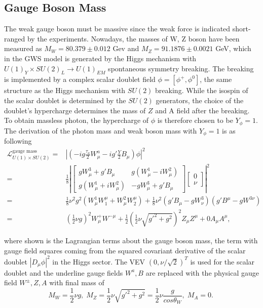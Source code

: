 \subsection{Gauge Boson Mass}
The weak gauge boson must be massive since the weak force is indicated short-ranged by the experiments. Nowadays, the masses of W, Z boson have been measured as $M_W =80.379\pm 0.012 $ Gev and $M_Z=91.1876\pm0.0021$ GeV, which in the GWS model is generated by the Higgs mechanism with $U(1)_Y \times SU(2)_L \to U(1)_{EM}$ spontaneous symmetry breaking. The breaking is implemented by a complex scalar doublet field $\phi = [\phi^+, \phi^0]$, the same structure as the Higgs mechanism with $SU(2)$ breaking. While the isospin of the scalar doublet is determined by the $SU(2)$ generators, the choice of the doublet's hypercharge determines the mass of $Z$ and A field after the breaking. To obtain massless photon, the hypercharge of $\phi$ is therefore chosen to be $Y_{\phi} = 1$. The derivation of the photon mass and weak boson mass with $Y_{\phi} = 1$ is as following 
\begin{equation}
\begin{split}
    \mathcal{L}_{U(1)\times SU(2)}^{\text{gauge mass}} 
    =& \left\lvert  (-ig\frac{\tau_a}{2} W_\mu^a - ig'\frac{Y}{2}B_\mu ) \phi \right\rvert^2 \\ 
    = & \frac{1}{8} \left\lvert 
        \begin{bmatrix} 
             gW_\mu^3 + g'B_\mu & g(W^1_\mu-iW^2_\mu) \\
            g(W^1_\mu+iW^2_\mu) & -gW_\mu^3 + g'B_\mu 
        \end{bmatrix}
        \begin{bmatrix} 0 \\ \nu \end{bmatrix} \right\rvert^2 \\
    = & \frac{1}{8}\nu^2g^2 (W^1_\mu W^\mu_1 +W^2_\mu W^\mu_2) + \frac{1}{8}\nu^2(g'B_\mu-gW^3_\nu)(g'B^\mu-gW^{3\nu}) \\
    = &  (\frac{1}{2}\nu g)^2 W^+_\mu W^{-\mu} +  \frac{1}{2} (\frac{1}{2}\nu \sqrt{g'^2+g^2})^2 Z_\mu Z^\mu + 0 A_\mu A^\mu ,
\end{split}
\label{eqn:physics:qft:gws:gaugeMassLagragian}
\end{equation}

\noindent where shown is the Lagrangian terms about the gauge boson mass, the term with gauge field squares coming from the squared covariant derivative of the scalar doublet $|D_\mu \phi|^2$ in the Higgs sector. The VEV $ (0, \nu/\sqrt{2})^T$ is used for the scalar doublet and the underline gauge fields $W^a, B$  are replaced with the physical gauge field $W^\pm, Z, A$ with final mass of
\begin{equation}
    M_W = \frac{1}{2}\nu g, \; M_Z = \frac{1}{2}\nu \sqrt{g'^2+g^2}= \frac{1}{2}\nu \frac{g}{cos\theta_W}, \;  M_A= 0 . \; 
\end{equation}

